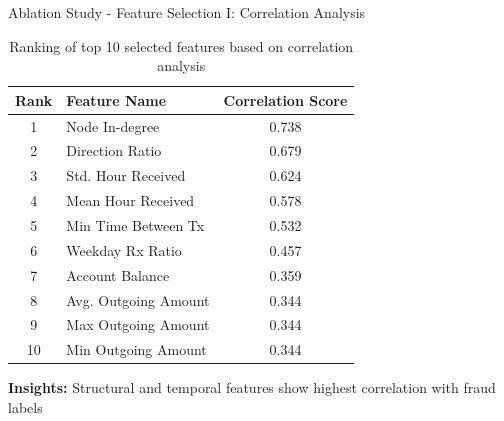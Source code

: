 \documentclass{beamer}
\begin{document}
\begin{frame}{Ablation Study - Feature Selection I: Correlation Analysis}
    \begin{table}
        \centering
        \tiny
        \caption{Ranking of top 10 selected features based on correlation analysis}
        \begin{tabular}{clc}
            \hline
            \textbf{Rank} & \textbf{Feature Name} & \textbf{Correlation Score} \\
            \hline
            1 & Node In-degree & 0.738 \\
            2 & Direction Ratio & 0.679 \\
            3 & Std. Hour Received & 0.624 \\
            4 & Mean Hour Received & 0.578 \\
            5 & Min Time Between Tx & 0.532 \\
            6 & Weekday Rx Ratio & 0.457 \\
            7 & Account Balance & 0.359 \\
            8 & Avg. Outgoing Amount & 0.344 \\
            9 & Max Outgoing Amount & 0.344 \\
            10 & Min Outgoing Amount & 0.344 \\
            \hline
        \end{tabular}
    \end{table}
    
    \vspace{0.3cm}
    \textbf{Insights:} Structural and temporal features show highest correlation with fraud labels
\end{frame}
\end{document}
